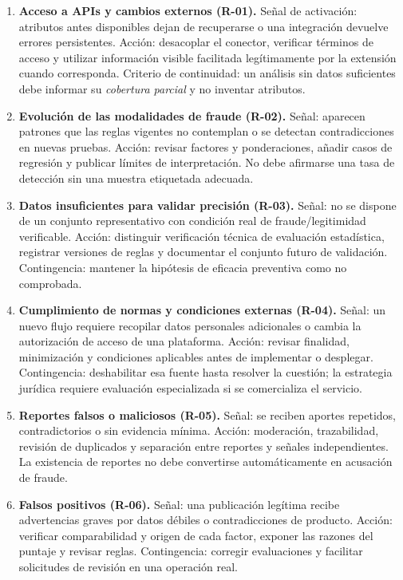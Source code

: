 \begin{enumerate}
    \item \textbf{Acceso a APIs y cambios externos (R-01).} Señal de activación: atributos antes disponibles dejan de recuperarse o una integración devuelve errores persistentes. Acción: desacoplar el conector, verificar términos de acceso y utilizar información visible facilitada legítimamente por la extensión cuando corresponda. Criterio de continuidad: un análisis sin datos suficientes debe informar su \emph{cobertura parcial} y no inventar atributos.

    \item \textbf{Evolución de las modalidades de fraude (R-02).} Señal: aparecen patrones que las reglas vigentes no contemplan o se detectan contradicciones en nuevas pruebas. Acción: revisar factores y ponderaciones, añadir casos de regresión y publicar límites de interpretación. No debe afirmarse una tasa de detección sin una muestra etiquetada adecuada.

    \item \textbf{Datos insuficientes para validar precisión (R-03).} Señal: no se dispone de un conjunto representativo con condición real de fraude/legitimidad verificable. Acción: distinguir verificación técnica de evaluación estadística, registrar versiones de reglas y documentar el conjunto futuro de validación. Contingencia: mantener la hipótesis de eficacia preventiva como no comprobada.

    \item \textbf{Cumplimiento de normas y condiciones externas (R-04).} Señal: un nuevo flujo requiere recopilar datos personales adicionales o cambia la autorización de acceso de una plataforma. Acción: revisar finalidad, minimización y condiciones aplicables antes de implementar o desplegar. Contingencia: deshabilitar esa fuente hasta resolver la cuestión; la estrategia jurídica requiere evaluación especializada si se comercializa el servicio.

    \item \textbf{Reportes falsos o maliciosos (R-05).} Señal: se reciben aportes repetidos, contradictorios o sin evidencia mínima. Acción: moderación, trazabilidad, revisión de duplicados y separación entre reportes y señales independientes. La existencia de reportes no debe convertirse automáticamente en acusación de fraude.

    \item \textbf{Falsos positivos (R-06).} Señal: una publicación legítima recibe advertencias graves por datos débiles o contradicciones de producto. Acción: verificar comparabilidad y origen de cada factor, exponer las razones del puntaje y revisar reglas. Contingencia: corregir evaluaciones y facilitar solicitudes de revisión en una operación real.


\end{enumerate}
